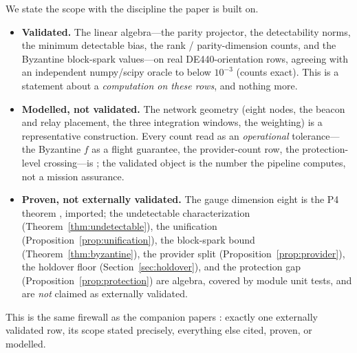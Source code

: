 We state the scope with the discipline the paper is built on.
\begin{itemize}
  \item \textbf{Validated.} The linear algebra---the parity projector, the detectability
  norms, the minimum detectable bias, the rank / parity-dimension counts, and the Byzantine
  block-spark values---on real DE440-orientation rows, agreeing with an independent
  numpy/scipy oracle to below $10^{-3}$ (counts exact). This is a statement about a
  \emph{computation on these rows}, and nothing more.
  \item \textbf{Modelled, not validated.} The network geometry (eight nodes, the beacon and
  relay placement, the three integration windows, the weighting) is a representative
  construction. Every count read as an \emph{operational} tolerance---the Byzantine $f$ as a
  flight guarantee, the provider-count row, the protection-level crossing---is
  \Modelled{}; the validated object is the number the pipeline computes, not a mission
  assurance.
  \item \textbf{Proven, not externally validated.} The gauge dimension eight is the P4
  theorem \citep{baweja2026gauge}, imported; the undetectable characterization
  (Theorem~\ref{thm:undetectable}), the unification (Proposition~\ref{prop:unification}), the
  block-spark bound (Theorem~\ref{thm:byzantine}), the provider split
  (Proposition~\ref{prop:provider}), the holdover floor (Section~\ref{sec:holdover}), and the
  protection gap (Proposition~\ref{prop:protection}) are \Proven{} algebra, covered by module
  unit tests, and are \emph{not} claimed as externally validated.
\end{itemize}
This is the same firewall as the companion papers
\citep{baweja2026datum,baweja2026commonmode,baweja2026gauge}: exactly one externally
validated row, its scope stated precisely, everything else cited, proven, or modelled.
